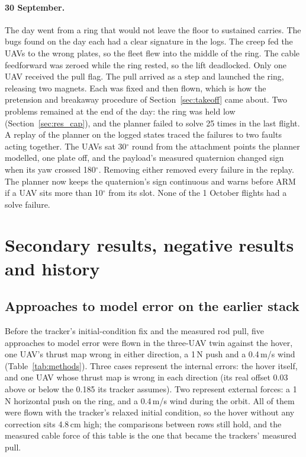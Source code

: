 \paragraph{30 September.} The day went from a ring that would not leave the floor to sustained
carries. The bugs found on the day each had a clear signature in the logs. The creep fed the UAVs to the
wrong plates, so the fleet flew into the middle of the ring. The cable feedforward was zeroed while the
ring rested, so the lift deadlocked. Only one UAV received the pull flag. The pull arrived as a step
and launched the ring, releasing two magnets. Each was fixed and then flown, which is how the
pretension and breakaway procedure of Section~\ref{sec:takeoff} came about. Two problems remained at
the end of the day: the ring was held low (Section~\ref{sec:res_cap}), and the planner failed to solve 25 times in the last
flight.
A replay of the planner on the logged states traced the failures to two faults acting
together. The UAVs sat 30$^\circ$ round from the attachment points the planner modelled, one plate off,
and the payload's measured quaternion changed sign when its yaw crossed 180$^\circ$. Removing either
removed every failure in the replay. The planner now keeps the quaternion's sign continuous and
warns before ARM if a UAV sits more than 10$^\circ$ from its slot. None of the 1 October flights had a
solve failure.

\section{Secondary results, negative results and history}
\label{sec:app_negatives}

\subsection{Approaches to model error on the earlier stack}
\label{sec:app_methods}

Before the tracker's initial-condition fix and the measured rod pull, five approaches to model error were flown in
the three-UAV twin against the hover, one UAV's thrust map wrong in either direction, a 1\,N push and a 0.4\,m/s wind
(Table~\ref{tab:methods}). Three cases represent the internal errors: the hover itself, and one UAV whose thrust map
is wrong in each direction (its real offset 0.03 above or below the 0.185 its tracker assumes). Two represent external
forces: a 1\,N horizontal push on the ring, and a 0.4\,m/s wind during the orbit. All of them were flown with the
tracker's relaxed initial condition, so the hover without any correction sits 4.8\,cm high; the comparisons between
rows still hold, and the measured cable force of this table is the one that became the trackers' measured pull.

